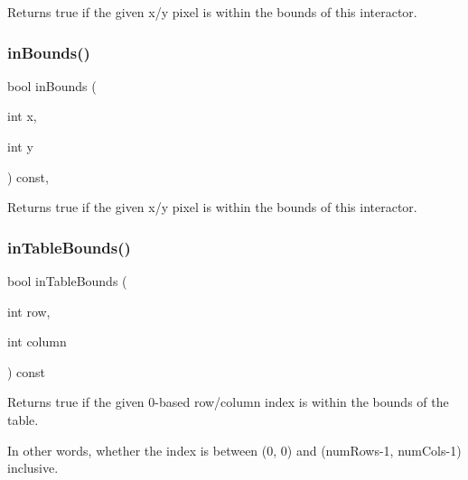 Returns true if the given x/y pixel is within the bounds of this interactor. 

\mbox{\label{classsgl_1_1GInteractor_ae6d7982c1c627b677a5e776ca86118ed}} 
\subsubsection{\texorpdfstring{in\+Bounds()}{inBounds()}\hspace{0.1cm}{\footnotesize\ttfamily [2/2]}}
{\footnotesize\ttfamily bool in\+Bounds (\begin{DoxyParamCaption}\item[{int}]{x,  }\item[{int}]{y }\end{DoxyParamCaption}) const\hspace{0.3cm}{\ttfamily [virtual]}, {\ttfamily [inherited]}}



Returns true if the given x/y pixel is within the bounds of this interactor. 

\mbox{\label{classsgl_1_1GTable_adcc2e619680a96a5b266d18a9ff2cdf4}} 
\subsubsection{\texorpdfstring{in\+Table\+Bounds()}{inTableBounds()}}
{\footnotesize\ttfamily bool in\+Table\+Bounds (\begin{DoxyParamCaption}\item[{int}]{row,  }\item[{int}]{column }\end{DoxyParamCaption}) const\hspace{0.3cm}{\ttfamily [virtual]}}



Returns true if the given 0-\/based row/column index is within the bounds of the table. 

In other words, whether the index is between (0, 0) and (num\+Rows-\/1, num\+Cols-\/1) inclusive. \mbox{\label{classsgl_1_1GObservable_aeec1adc19aa0f33de62390686ee1382c}} 
